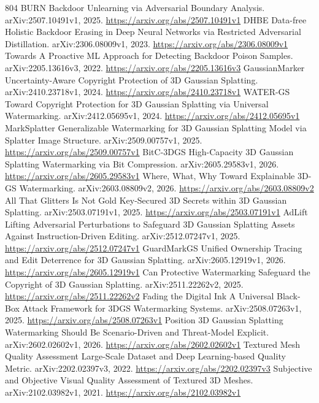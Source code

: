 \documentclass[11pt]{article}
\begin{document}
\begin{thebibliography}{804}
 BURN Backdoor Unlearning via Adversarial Boundary Analysis. arXiv:2507.10491v1, 2025. \url{https://arxiv.org/abs/2507.10491v1}
 DHBE Data-free Holistic Backdoor Erasing in Deep Neural Networks via Restricted Adversarial Distillation. arXiv:2306.08009v1, 2023. \url{https://arxiv.org/abs/2306.08009v1}
 Towards A Proactive ML Approach for Detecting Backdoor Poison Samples. arXiv:2205.13616v3, 2022. \url{https://arxiv.org/abs/2205.13616v3}
 GaussianMarker Uncertainty-Aware Copyright Protection of 3D Gaussian Splatting. arXiv:2410.23718v1, 2024. \url{https://arxiv.org/abs/2410.23718v1}
 WATER-GS Toward Copyright Protection for 3D Gaussian Splatting via Universal Watermarking. arXiv:2412.05695v1, 2024. \url{https://arxiv.org/abs/2412.05695v1}
 MarkSplatter Generalizable Watermarking for 3D Gaussian Splatting Model via Splatter Image Structure. arXiv:2509.00757v1, 2025. \url{https://arxiv.org/abs/2509.00757v1}
 BitC-3DGS High-Capacity 3D Gaussian Splatting Watermarking via Bit Compression. arXiv:2605.29583v1, 2026. \url{https://arxiv.org/abs/2605.29583v1}
 Where, What, Why Toward Explainable 3D-GS Watermarking. arXiv:2603.08809v2, 2026. \url{https://arxiv.org/abs/2603.08809v2}
 All That Glitters Is Not Gold Key-Secured 3D Secrets within 3D Gaussian Splatting. arXiv:2503.07191v1, 2025. \url{https://arxiv.org/abs/2503.07191v1}
 AdLift Lifting Adversarial Perturbations to Safeguard 3D Gaussian Splatting Assets Against Instruction-Driven Editing. arXiv:2512.07247v1, 2025. \url{https://arxiv.org/abs/2512.07247v1}
 GuardMarkGS Unified Ownership Tracing and Edit Deterrence for 3D Gaussian Splatting. arXiv:2605.12919v1, 2026. \url{https://arxiv.org/abs/2605.12919v1}
 Can Protective Watermarking Safeguard the Copyright of 3D Gaussian Splatting. arXiv:2511.22262v2, 2025. \url{https://arxiv.org/abs/2511.22262v2}
 Fading the Digital Ink A Universal Black-Box Attack Framework for 3DGS Watermarking Systems. arXiv:2508.07263v1, 2025. \url{https://arxiv.org/abs/2508.07263v1}
 Position 3D Gaussian Splatting Watermarking Should Be Scenario-Driven and Threat-Model Explicit. arXiv:2602.02602v1, 2026. \url{https://arxiv.org/abs/2602.02602v1}
 Textured Mesh Quality Assessment Large-Scale Dataset and Deep Learning-based Quality Metric. arXiv:2202.02397v3, 2022. \url{https://arxiv.org/abs/2202.02397v3}
 Subjective and Objective Visual Quality Assessment of Textured 3D Meshes. arXiv:2102.03982v1, 2021. \url{https://arxiv.org/abs/2102.03982v1}

\end{thebibliography}
\end{document}
